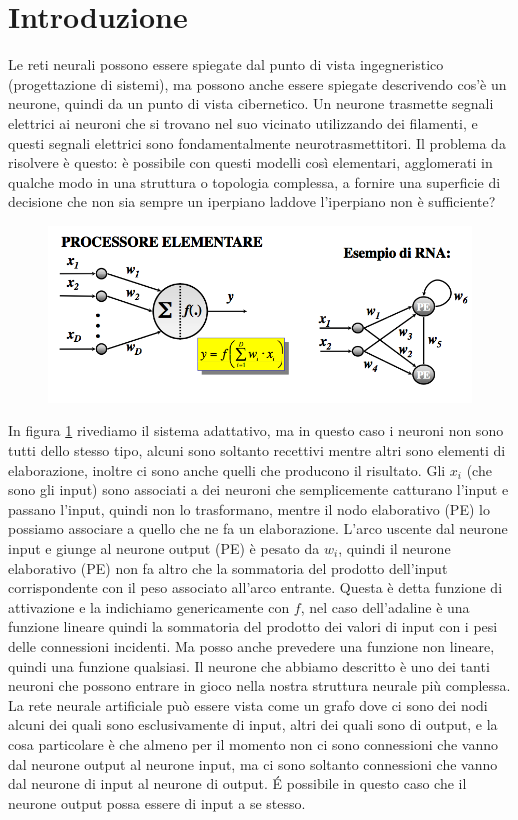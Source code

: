 \section{Introduzione}
Le reti neurali possono essere spiegate dal punto di vista ingegneristico (progettazione di sistemi), ma possono anche essere spiegate descrivendo cos'è un neurone, quindi da un punto di vista cibernetico. Un neurone trasmette segnali elettrici ai neuroni che si trovano nel suo vicinato utilizzando dei filamenti, e questi segnali elettrici sono fondamentalmente neurotrasmettitori. Il problema da risolvere è questo: è possibile con questi modelli così elementari, agglomerati in qualche modo in una struttura o topologia complessa, a fornire una superficie di decisione che non sia sempre un iperpiano laddove l'iperpiano non è sufficiente?
\begin{figure}
\centering
\includegraphics[scale=0.5]{img/rete_neurale.png}
\label{reti}
\end{figure}
\noindent In figura \ref{reti} rivediamo il sistema adattativo, ma in questo caso i neuroni non sono tutti dello stesso tipo, alcuni sono soltanto recettivi mentre altri sono elementi di elaborazione, inoltre ci sono anche quelli che producono il risultato. Gli $x_i$ (che sono gli input) sono associati a dei neuroni che semplicemente catturano l'input e passano l'input, quindi non lo trasformano, mentre il nodo elaborativo (PE) lo possiamo associare a quello che ne fa un elaborazione. L'arco uscente dal neurone input e giunge al neurone output (PE) è pesato da $w_i$, quindi il neurone elaborativo (PE) non fa altro che la sommatoria del prodotto dell'input corrispondente con il peso associato all'arco entrante. Questa è detta funzione di attivazione  e la indichiamo genericamente con $f$, nel caso dell'adaline è una funzione lineare quindi la sommatoria del prodotto dei valori di input con i pesi delle connessioni incidenti. Ma posso anche prevedere una funzione non lineare, quindi una funzione qualsiasi. Il neurone che abbiamo descritto è uno dei tanti neuroni che possono entrare in gioco nella nostra struttura neurale più complessa. La rete neurale artificiale può essere vista come un grafo dove ci sono dei nodi alcuni dei quali sono esclusivamente di input, altri dei quali sono di output, e la cosa particolare è che almeno per il momento non ci sono connessioni che vanno dal neurone output al neurone input, ma ci sono soltanto connessioni che vanno dal neurone di input al neurone di output. \'E possibile in questo caso che il neurone output possa essere di input a se stesso.\\

